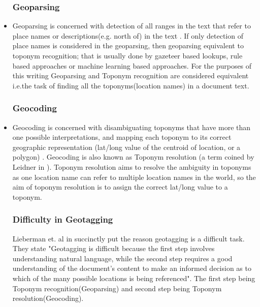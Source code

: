 \documentclass[
     11pt,         %
     a4paper,      %
     oneside,
     ]{article}
\begin{document}
\begin{itemize}[leftmargin=*]
	\subsubsection{Geoparsing} 
	\item[] Geoparsing is concerned with detection of all ranges in the text that refer to place names or descriptions(e.g. north of) in the text \cite{Leidner:2011:DGR:2047296.2047298}. If only detection of place names is considered in the geoparsing, then geoparsing equivalent to toponym recognition; that is usually done by gazeteer based lookups, rule based approaches or machine learning based approaches. For the purposes of this writing Geoparsing and Toponym recognition are considered equivalent i.e.the task of finding all the toponyms(location names) in a document text.
	\subsubsection{Geocoding} 
	\item[] Geocoding is concerned with disambiguating toponyms that have more than one possible interpretations, and mapping each toponym to its correct geographic representation (lat/long value of the centroid of location, or a polygon) \cite{Leidner:2011:DGR:2047296.2047298}. Geocoding is also known as Toponym resolution (a term coined by Leidner in \cite{Leidner:2008:PhD}). Toponym resolution aims to resolve the ambiguity in toponyms as one location name can refer to multiple location names in the world, so the aim of toponym resolution is to assign the correct lat/long value to a toponym.
	\subsubsection{Difficulty in Geotagging} Lieberman et. al in \cite{lieberman2010geotagging} succinctly put the reason geotagging is a difficult task. They state "Geotagging is difficult because the first step involves understanding natural language, while the second step requires a good understanding of the document’s content to make an informed decision as to which of the many possible locations is being referenced". The first step being Toponym recognition(Geoparsing) and second step being Toponym resolution(Geocoding).
\end{itemize}
\end{document}

